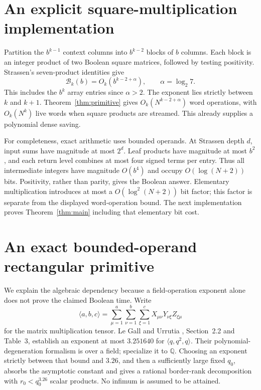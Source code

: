 \documentclass[acmlarge,11pt,screen,nonacm]{acmart}
\newcommand{\Q}{\mathbb Q}
\begin{document}
\section{An explicit square-multiplication implementation}\label{sec:fallback}
Partition the $b^{k-1}$ context columns into $b^{k-2}$ blocks of $b$ columns.
Each block is an integer product of two Boolean square matrices, followed by
testing positivity. Strassen's seven-product identities \cite{Str69} give
\[
 \mathcal B_k(b)=O_k(b^{k-2+\alpha}),\qquad \alpha=\log_2 7.
\]
This includes the $b^k$ array entries since $\alpha>2$. The exponent lies
strictly between $k$ and $k+1$. Theorem~\ref{thm:primitive} gives
$O_k(N^{k-2+\alpha})$ word operations, with $O_k(N^k)$ live words when square
products are streamed. This already supplies a polynomial dense saving.

For completeness, exact arithmetic uses bounded operands. At Strassen depth
$d$, input sums have magnitude at most $2^d$. Leaf products have magnitude
at most $b^2$, and each return level combines at most four signed terms per
entry. Thus all intermediate integers have magnitude $O(b^4)$ and occupy
$O(\log(N+2))$ bits. Positivity, rather than parity, gives the Boolean
answer. Elementary multiplication introduces at most a
$O(\log^2(N+2))$ bit factor; this factor is separate from the displayed
word-operation bound. The next implementation proves Theorem~\ref{thm:main}
including that elementary bit cost.

\section{An exact bounded-operand rectangular primitive}\label{sec:rectangular}
We explain the algebraic dependency because a field-operation exponent
alone does not prove the claimed Boolean time. Write
\[
 \langle a,b,c\rangle=\sum_{\mu=1}^a\sum_{\nu=1}^b\sum_{\xi=1}^c
 X_{\mu\nu}Y_{\nu\xi}Z_{\xi\mu}
\]
for the matrix multiplication tensor. Le Gall and Urrutia
\cite{LGU18}, Section~2.2 and Table~3, establish an exponent at most
$3.251640$ for $\langle q,q^2,q\rangle$. Their polynomial-degeneration
formalism is over a field; specialize it to $\Q$. Choosing an exponent
strictly between that bound and $3.26$, and then a sufficiently large fixed
$q_0$, absorbs the asymptotic constant and gives a rational border-rank
decomposition with $r_0<q_0^{3.26}$ scalar products. No infimum is assumed
to be attained.
\end{document}
